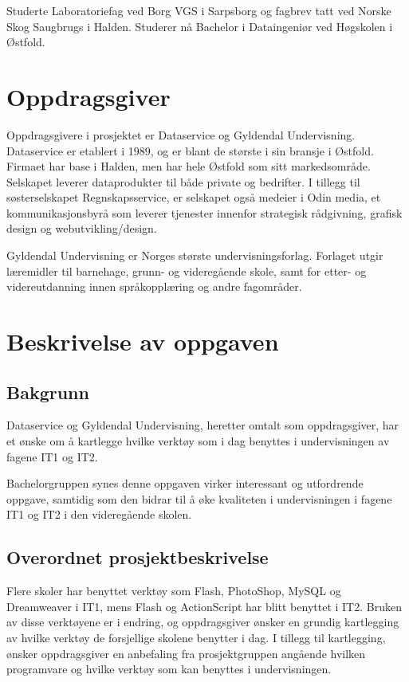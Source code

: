 \documentclass[norsk,a4paper,12pt]{article}
\begin{document}
Studerte Laboratoriefag ved Borg VGS i Sarpsborg og fagbrev tatt ved Norske Skog Saugbrugs i Halden. Studerer nå Bachelor i Dataingeniør ved Høgskolen i Østfold.


\section{Oppdragsgiver}

Oppdragsgivere i prosjektet er Dataservice og Gyldendal Undervisning. Dataservice er etablert i 1989, og er blant de største i sin bransje i Østfold. Firmaet har base i Halden, men har hele Østfold som sitt markedsområde. Selskapet leverer dataprodukter til både private og bedrifter. I tillegg til søsterselskapet Regnskapsservice, er selskapet også medeier i Odin media, et kommunikasjonsbyrå som leverer tjenester innenfor strategisk rådgivning, grafisk design og webutvikling/design.\newline

Gyldendal Undervisning er Norges største undervisningsforlag. Forlaget utgir læremidler til barnehage, grunn- og videregående skole, samt for etter- og videreutdanning innen språkopplæring og andre fagområder.

\newpage

\section{Beskrivelse av oppgaven}

\subsection{Bakgrunn}

Dataservice og Gyldendal Undervisning, heretter omtalt som oppdragsgiver,  har et ønske om å kartlegge hvilke verktøy som i dag benyttes i undervisningen av fagene IT1 og IT2. 

Bachelorgruppen synes denne oppgaven virker interessant og utfordrende oppgave, samtidig som den bidrar til å øke kvaliteten i undervisningen i fagene IT1 og IT2 i den videregående skolen. 

\subsection{Overordnet prosjektbeskrivelse}

 

Flere skoler har benyttet verktøy som Flash, PhotoShop, MySQL og Dreamweaver i IT1, mens Flash og ActionScript har blitt benyttet i IT2. 
Bruken av disse verktøyene er i endring, og oppdragsgiver ønsker en grundig kartlegging av hvilke verktøy de forsjellige skolene benytter i dag. I tillegg til kartlegging,  ønsker oppdragsgiver en anbefaling fra prosjektgruppen angående hvilken programvare og hvilke verktøy som kan benyttes i undervisningen. 
\end{document}

